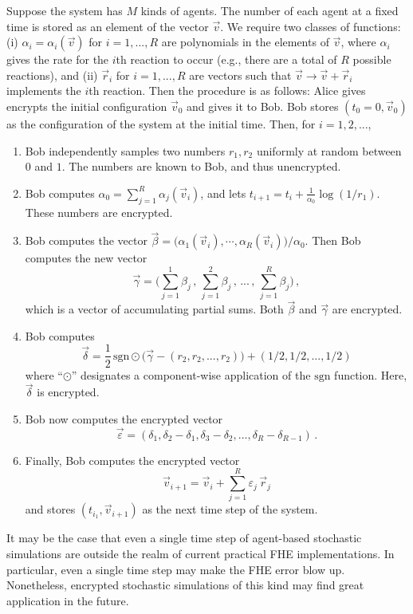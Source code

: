 \documentclass[12pt]{article}
\begin{document}
Suppose the system has $M$ kinds of agents.  The number of each agent at a fixed time is stored as an element of the vector $\vec{v}$.  We require two classes of functions: (i) $\alpha_i = \alpha_i(\vec{v})$ for $i=1,...,R$ are polynomials in the elements of $\vec{v}$, where $\alpha_i$ gives the rate for the $i$th reaction to occur (e.g., there are a total of $R$ possible reactions), and (ii) $\vec{r}_i$ for $i=1,...,R$ are vectors such that $\vec{v} \to \vec{v} + \vec{r}_i$ implements the $i$th reaction.  Then the procedure is as follows: Alice gives encrypts the initial configuration $\vec{v}_0$ and gives it to Bob.  Bob stores $(t_0 = 0, \vec{v}_0)$ as the configuration of the system at the initial time. Then, for $i=1,2,...$,
\begin{enumerate}
\item Bob independently samples two numbers $r_1, r_2$ uniformly at random between $0$ and $1$.  The numbers are known to Bob, and thus unencrypted.
\item Bob computes $\alpha_0 = \sum_{j=1}^R \alpha_j(\vec{v}_{i})$, and lets $t_{i+1} = t_i + \frac{1}{\alpha_0} \log(1/r_1)$.  These numbers are encrypted.
\item Bob computes the vector $\vec{\beta} = \big(\alpha_1(\vec{v}_i), \cdots , \alpha_R(\vec{v}_i)\big)/\alpha_0$.  Then Bob computes the new vector
\begin{equation}
\vec{\gamma} = \big(\sum_{j=1}^1 \beta_j\,,\,\sum_{j=1}^2 \beta_j\,,\,...\,,\,\sum_{j=1}^R \beta_j\big)\,,
\end{equation}
which is a vector of accumulating partial sums.  Both $\vec{\beta}$ and $\vec{\gamma}$ are encrypted.
\item Bob computes
\begin{equation}
\vec{\delta} = \frac{1}{2}\,\text{sgn} \odot \big(\vec{\gamma} - (r_2, r_2, ..., r_2) \big) + (1/2, 1/2, ..., 1/2)
\end{equation}
where ``$\odot$'' designates a component-wise application of the $\text{sgn}$ function.  Here, $\vec{\delta}$ is encrypted. \\
\item Bob now computes the encrypted vector
\begin{equation}
\vec{\varepsilon} = (\delta_1, \delta_2 - \delta_1, \delta_3 - \delta_2, ..., \delta_R - \delta_{R-1} )\,.
\end{equation}
\item Finally, Bob computes the encrypted vector
\begin{equation}
\vec{v}_{i+1} = \vec{v}_i + \sum_{j=1}^R \varepsilon_j \, \vec{r}_j
\end{equation}
and stores $(t_{i_1}, \vec{v}_{i+1})$ as the next time step of the system.
\end{enumerate}
It may be the case that even a single time step of agent-based stochastic simulations are outside the realm of current practical FHE implementations.  In particular, even a single time step may make the FHE error blow up.  Nonetheless, encrypted stochastic simulations of this kind may find great application in the future.
\end{document}
